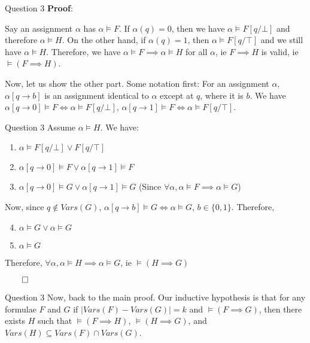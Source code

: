 \documentclass{beamer}
\begin{document}
{\begin{frame}{Question 3}
            \textbf{Proof}:

            Say an assignment $\alpha$ has $\alpha \vDash F$. If $\alpha(q) = 0$, then we have $\alpha \vDash F[q/\bot]$ and therefore $\alpha \vDash H$. On the other hand, if $\alpha(q) = 1$, then $\alpha \vDash F[q/\top]$ and we still have $\alpha \vDash H$. Therefore, we have $\alpha \vDash F \implies \alpha \vDash H$ for all $\alpha$, ie $F \implies H$ is valid, ie $\vDash (F \implies H)$.

            Now, let us show the other part. Some notation first: For an assignment $\alpha$, $\alpha[q \rightarrow b]$ is an assignment identical to $\alpha$ except at $q$, where it is $b$. We have $\alpha[q \rightarrow 0] \vDash F \iff \alpha \vDash F[q/\bot]$, $\alpha[q \rightarrow 1] \vDash F \iff \alpha \vDash F[q/\top]$.
        \end{frame}

        \begin{frame}{Question 3}
            Assume $\alpha \vDash H$. We have:
            \begin{enumerate}
                \item $\alpha \vDash F[q/\bot] \lor F[q/\top]$
                \item  $\alpha[q \rightarrow 0] \vDash F \lor \alpha[q \rightarrow 1] \vDash F$
                \item $\alpha[q \rightarrow 0] \vDash G \lor \alpha[q \rightarrow 1] \vDash G$ (Since $\forall \alpha, \alpha \vDash F \implies \alpha \vDash G$)
            \end{enumerate}
            Now, since $q \notin Vars(G)$, $\alpha[q \rightarrow b] \vDash G \iff \alpha \vDash G$, $b \in \{0, 1\}$. Therefore,
            \begin{enumerate}
                \setcounter{enumi}{3}
                \item $\alpha \vDash G \lor \alpha \vDash G$
                \item $\alpha \vDash G$
            \end{enumerate}
            Therefore, $\forall \alpha, \alpha \vDash H \implies \alpha \vDash G$, ie $\vDash (H \implies G)$

            $\qed$
        \end{frame}

        \begin{frame}{Question 3}
            Now, back to the main proof. Our inductive hypothesis is that for any formulae $F$ and $G$ if $|Vars(F) - Vars(G)| = k$ and $\vDash (F \implies G)$, then there exists $H$ such that $\vDash (F \implies H)$, $\vDash (H \implies G)$, and $Vars(H) \subseteq Vars(F) \cap Vars(G)$.


\end{frame}}
\end{document}
